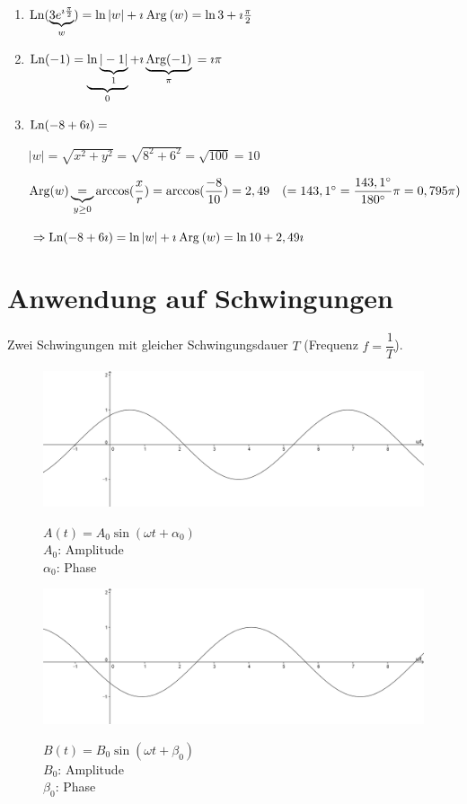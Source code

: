 \Bsps
\begin{enumerate}
	\item $\mathbin\text{Ln}(\underbrace{3e^{\imath \frac{\pi}{2}}}_w)=\ln|w|+\imath \mathbin\text{Arg}(w)\\
	=\ln3+\imath \frac{\pi}{2}$
	
	\item $\mathbin\text{Ln}(-1)=\underbrace{\ln\underbrace{|-1|}_1}_0+\imath \underbrace{\mathbin\text{Arg}(-1)}_\pi\\
	=\imath \pi$
	
	\item $\mathbin\text{Ln}(-8+6\imath )=$
	
	$|w|=\sqrt{x^2+y^2}=\sqrt{8^2+6^2}=\sqrt{100}=10$
	
	$\mathbin\text{Arg}(w)\underbrace{=}_{y\geq0}\arccos(\dfrac{x}{r})=\arccos(\dfrac{-8}{10})=2,49\quad(=143,1{^\circ}=\dfrac{143,1{^\circ}}{180{^\circ}}\pi=0,795\pi)$
	
	$\Rightarrow \mathbin\text{Ln}(-8+6\imath )=\ln|w|+\imath \mathbin\text{Arg}(w)\\
	=\ln10+2,49\imath $
\end{enumerate}

\clearpage
\section{Anwendung auf Schwingungen}

Zwei Schwingungen mit gleicher Schwingungsdauer $T$ (Frequenz $f = \dfrac{1}{T}$).

\begin{figure}[h!]
	\includegraphics[width=\linewidth]{Bilder/39}
	\caption{}
	\vspace{-5em}
	$A(t)=A_0\sin(\omega t+\alpha_0)$\\
	$A_0$: Amplitude\\
	$\alpha_0$: Phase
\end{figure}

\begin{figure}[h!]
	\includegraphics[width=\linewidth]{Bilder/40}
	\caption{}
	\vspace{-5em}
	$B(t)=B_0\sin(\omega t+\beta_0)$\\
	$B_0$: Amplitude\\
	$\beta_0$: Phase
\end{figure}

